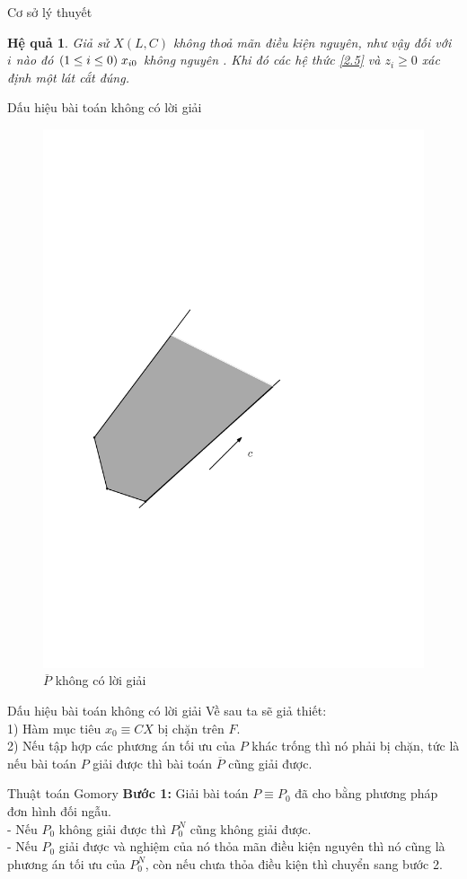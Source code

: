 \documentclass[10pt]{beamer}
\newtheorem{hq}{Hệ quả}[section]
\begin{document}
    \begin{frame}{Cơ sở lý thuyết}
        \begin{hq}
        Giả sử $X(L,C)$ không thoả mãn điều kiện nguyên, như vậy đối 
với $i$ nào đó $(1\le i \le 0) \hspace{0.1cm} x_{i0}$ không nguyên . Khi đó các hệ thức \eqref{2.5}  và $z_i \ge 0$ xác định một lát cắt đúng.
    \end{hq} 
    \end{frame}

\begin{frame}{Dấu hiệu bài toán không có lời giải}
\begin{figure}[h]
    \centering
    \includegraphics[width=0.45\linewidth]{anh3.pdf}
    \caption{$\overline{P}$ không có lời giải}
\end{figure}
    \end{frame}

    \begin{frame}{Dấu hiệu bài toán không có lời giải}
        Về sau ta sẽ giả thiết:\\
1) Hàm mục tiêu $x_0\equiv CX$ bị chặn trên $F$.\\
2) Nếu tập hợp các phương án tối ưu của $P$ khác trống thì nó phải bị chặn, tức là nếu bài toán $P$ giải được thì bài toán $\overline{P}$ cũng giải 
được.\\
    \end{frame}

    \begin{frame}{Thuật toán Gomory}
        \textbf{Bước 1:}
Giải bài toán $P\equiv P_0$ đã cho bằng phương pháp đơn hình đối ngẫu.\\
- Nếu $P_0$ không giải được thì $P_0^N$ cũng không giải được.\\
- Nếu  $P_0$ giải được và nghiệm của nó thỏa mãn điều kiện nguyên thì nó cũng là phương án tối ưu của $P^N_0$, còn nếu chưa thỏa điều kiện thì chuyển sang bước 2.\\
       
    \end{frame}
\end{document}
